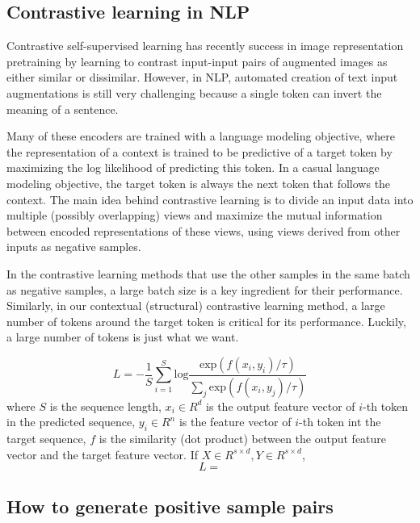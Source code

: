 \documentclass[a4paper]{article}
\begin{document}
	\subsection{Contrastive learning in NLP}
	\cite{rethmeier2021primer}
	Contrastive self-supervised learning has recently success in image representation pretraining by learning to contrast input-input pairs of augmented images as either similar or dissimilar.
	However, in NLP, automated creation of text input augmentations is still very challenging because a single token can invert the meaning of a sentence.
	
	\cite{kong2019mutual}
	Many of these encoders are trained with a language modeling objective, where the representation of a context is trained to be predictive of a target token by maximizing the log likelihood of predicting this token.
	In a casual language modeling objective, the target token is always the next token that follows the context.
	The main idea behind contrastive learning is to divide an input data into multiple (possibly overlapping) views and maximize the mutual information between encoded representations of these views, using views derived from other inputs as negative samples.

	In the contrastive learning methods that use the other samples in the same batch as negative samples, a large batch size is a key ingredient for their performance.
	Similarly, in our contextual (structural) contrastive learning method, a large number of tokens around the target token is critical for its performance.
	Luckily, a large number of tokens is just what we want.

	\begin{equation}
		L = -\frac{1}{S} \sum_{i=1}^S \text{log} \frac{\text{exp}(f(x_i, y_i) / \tau)}{\sum_{j} \text{exp}(f(x_i, y_j) / \tau)}
	\end{equation}
	where $S$ is the sequence length, $x_i \in R^d$ is the output feature vector of $i$-th token in the predicted sequence, 
	$y_i \in R^n$ is the feature vector of $i$-th token int the target sequence,
	$f$ is the similarity (dot product) between the output feature vector and the target feature vector.
	If $X \in R^{s \times d}, Y \in R^{s \times d}$,
	\begin{equation}
		L = 
	\end{equation}

	\subsection{How to generate positive sample pairs}
\end{document}
